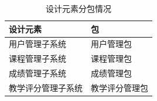 \begin{table}[H]
  \caption{设计元素分包情况}
  \label{table:designElements_and_package}
  \begin{tabularx}{\textwidth}{|Y|Y|}
    \hline
    \textbf{设计元素}&\textbf{包}\\
    \hline
    用户管理子系统&用户管理包\\
    \hline
    课程管理子系统&课程管理包\\
    \hline
    成绩管理子系统&成绩管理包\\
    \hline
    教学评分管理子系统&教学评分管理包\\
    \hline
  \end{tabularx}
\end{table}
